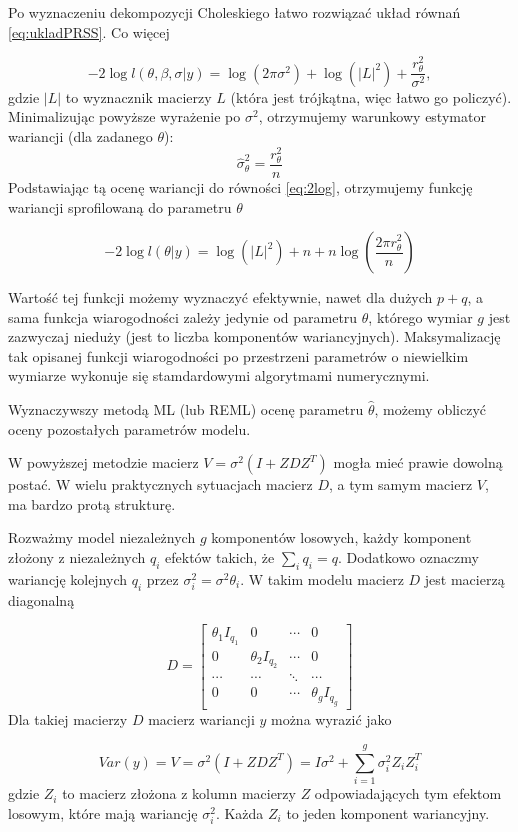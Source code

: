 \documentclass[12pt]{mwbk}
\theoremstyle{plain}
\theoremstyle{definition}
\theoremstyle{remark}
\begin{document}
Po wyznaczeniu dekompozycji Choleskiego łatwo rozwiązać układ równań \ref{eq:ukladPRSS}. Co więcej

\begin{equation} \label{eq:2log}
-2\log l(\theta,\beta,\sigma|y)=\log(2\pi \sigma^2)+\log(|L|^2) +\frac{r^2_{\theta}}{\sigma^2}, 
\end{equation}
gdzie $|L|$ to wyznacznik macierzy $L$ (która jest trójkątna, więc łatwo go policzyć). Minimalizując powyższe wyrażenie po $\sigma^2$, otrzymujemy warunkowy estymator wariancji (dla zadanego $\theta$):
$$\hat{\sigma}_{\theta}^2=\frac{r^2_{\theta}}{n}$$
Podstawiając tą ocenę wariancji do równości \ref{eq:2log}, otrzymujemy funkcję wariancji sprofilowaną do parametru $\theta$

$$-2 \log l(\theta|y)=\log(|L|^2)+n+n\log\left(\frac{2\pi r^2_{\theta}}{n}\right)$$

Wartość tej funkcji możemy wyznaczyć efektywnie, nawet dla dużych $p+q$, a sama funkcja wiarogodności zależy jedynie od parametru $\theta$, którego wymiar $g$ jest zazwyczaj nieduży (jest to liczba komponentów wariancyjnych). Maksymalizację tak opisanej funkcji wiarogodności po przestrzeni parametrów o niewielkim wymiarze wykonuje się stamdardowymi algorytmami numerycznymi.

Wyznaczywszy metodą ML (lub REML) ocenę parametru $\hat{\theta}$, możemy obliczyć oceny pozostałych parametrów modelu. 

W powyższej metodzie macierz $V=\sigma^2(I+ZDZ^T)$ mogła mieć prawie dowolną postać. W wielu praktycznych sytuacjach macierz $D$, a tym samym macierz $V$, ma bardzo protą strukturę.

Rozważmy model niezależnych $g$ komponentów losowych, każdy komponent złożony z niezależnych $q_i$ efektów takich, że $\sum\limits_i q_i=q$. Dodatkowo oznaczmy wariancję kolejnych $q_i$ przez $\sigma^2_i=\sigma^2\theta_i$. W takim modelu macierz $D$ jest macierzą diagonalną

$$D=\begin{bmatrix}
\theta_1I_{q_1} & 0 & \cdots & 0 \\
0 & \theta_2I_{q_2} & \cdots & 0 \\
\cdots & \cdots & \ddots & \cdots \\
0 & 0 & \cdots & \theta_gI_{q_g}
\end{bmatrix}$$
Dla takiej macierzy $D$ macierz wariancji $y$ można wyrazić jako

$$Var(y)=V=\sigma^2(I+ZDZ^T)=I\sigma^2+\sum_{i=1}^{g}\sigma_i^2Z_iZ_i^T$$
gdzie $Z_i$ to macierz złożona z kolumn macierzy $Z$ odpowiadających tym efektom losowym, które mają wariancję $\sigma^2_i$. Każda $Z_i$ to jeden komponent wariancyjny.
\end{document}
